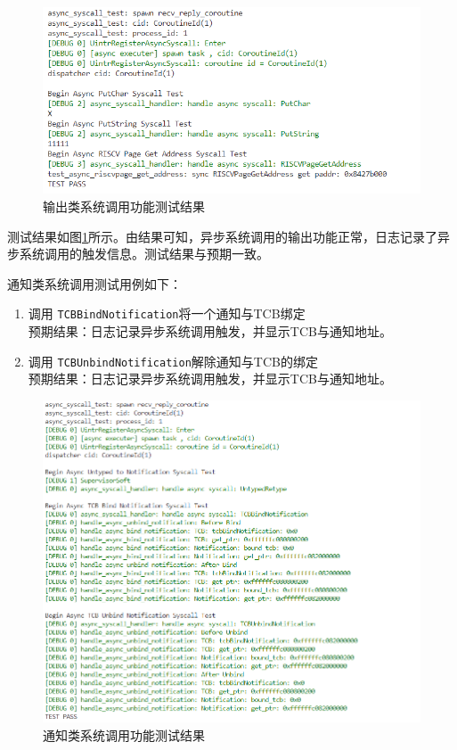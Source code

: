\begin{figure}[htbp]
  \centering
  \includegraphics[width=\textwidth]{images/output_test.png}
  \caption{输出类系统调用功能测试结果}\label{outputtest}
\end{figure}

测试结果如图\ref{outputtest}所示。由结果可知，异步系统调用的输出功能正常，日志记录了异步系统调用的触发信息。测试结果与预期一致。

通知类系统调用测试用例如下：

\begin{enumerate}
  \item 调用 \texttt{TCBBindNotification}将一个通知与TCB绑定\\
        预期结果：日志记录异步系统调用触发，并显示TCB与通知地址。
  \item 调用 \texttt{TCBUnbindNotification}解除通知与TCB的绑定\\
        预期结果：日志记录异步系统调用触发，并显示TCB与通知地址。
\end{enumerate}

\begin{figure}[htbp]
  \centering
  \includegraphics[width=\textwidth]{images/ntfntest.png}
  \caption{通知类系统调用功能测试结果}\label{ntfntest}
\end{figure}

